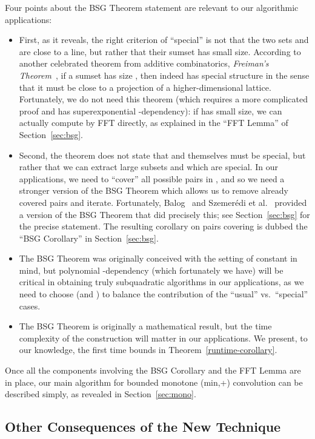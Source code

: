 \documentclass[11pt]{article}
\begin{document}
Four points about the BSG Theorem statement are relevant
to our algorithmic applications:
\begin{itemize}
\item
First, as it reveals, the right criterion of ``special'' is not that
the two sets  and  are close to a line, but rather that
their sumset  has small size.
According to another celebrated
theorem from additive combinatorics, {\em Freiman's Theorem}~\cite{Fre,TV06},
if a sumset  has size , then 
indeed has special structure in the sense that it must
be close to a projection of a higher-dimensional
lattice.  Fortunately, we do not need this theorem (which
requires a more complicated proof and has
superexponential -dependency): if  has small size,
we can actually compute  by FFT directly, as explained in the
``FFT Lemma'' of Section~\ref{sec:bsg}.
\item
Second, the theorem does not state that  and  themselves
must be special,
but rather that we can extract large subsets  and  which are special.
In our applications, we need to ``cover'' all possible pairs
in , and so we need a stronger version of the
BSG Theorem which allows us to remove already covered pairs and iterate.  Fortunately,
Balog~\cite{Balog07} and Szemer\'edi et al.~\cite{SSV94} provided
a version of the BSG Theorem that did precisely this;
see Section~\ref{sec:bsg} for the precise statement.
The resulting corollary on pairs covering is dubbed
the ``BSG Corollary'' in Section~\ref{sec:bsg}.
\item
The BSG Theorem was originally conceived with the setting
of constant  in mind, but
polynomial -dependency (which fortunately we have)
will be critical in obtaining truly
subquadratic algorithms in our applications, as we need to
choose  (and ) to balance the contribution of
the ``usual'' vs.\ ``special'' cases.
\item
The BSG Theorem is originally
a mathematical result, but the time complexity of the
construction will matter in our applications.
We present, to our knowledge, the first time bounds in
Theorem~\ref{runtime-corollary}.
\end{itemize}

Once all the components involving the BSG Corollary and the FFT Lemma
are in place, our main algorithm for bounded monotone (min,+)
convolution can be described simply, as revealed in Section~\ref{sec:mono}.

\subsection{Other Consequences of the New Technique}
\end{document}
